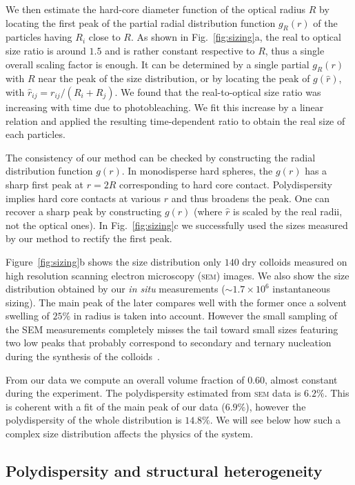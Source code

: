 \documentclass[8.5pt,twoside,twocolumn]{article}
\begin{document}
We then estimate the hard-core diameter function of the optical radius $R$ by locating the first peak of the partial radial distribution function $g_R(r)$ of the particles having $R_i$ close to $R$. As shown in Fig.~\ref{fig:sizing}a, the real to optical size ratio is around $1.5$ and is rather constant respective to $R$, thus a single overall scaling factor is enough. It can be determined by a single partial $g_R(r)$ with $R$ near the peak of the size distribution, or by locating the peak of $g(\hat{r})$, with $\hat{r}_{ij} = r_{ij}/(R_i+R_j)$. We found that the real-to-optical size ratio was increasing with time due to photobleaching. We fit this increase by a linear relation and applied the resulting time-dependent ratio to obtain the real size of each particles.

The consistency of our method can be checked by constructing the radial distribution function $g(r)$. In monodisperse hard spheres, the $g(r)$ has a sharp first peak at $r=2R$ corresponding to hard core contact. Polydispersity implies hard core contacts at various $r$ and thus broadens the peak. One can recover a sharp peak by constructing $g(\hat{r})$ (where $\hat{r}$ is scaled by the real radii, not the optical ones). In Fig.~\ref{fig:sizing}c we successfully used the sizes measured by our method to rectify the first peak.

Figure~\ref{fig:sizing}b shows the size distribution only $140$ dry colloids measured on high resolution scanning electron microscopy (\textsc{sem}) images. We also show the size distribution obtained by our \emph{in situ} measurements ($\sim 1.7\times 10^6$ instantaneous sizing). The main peak of the later compares well with the former once a solvent swelling of $25\%$ in radius is taken into account. However the small sampling of the SEM measurements completely misses the tail toward small sizes featuring two low peaks that probably correspond to secondary and ternary nucleation during the synthesis of the colloids~\cite{bosma2002,Poon2012}.

From our data we compute an overall volume fraction of $0.60$, almost constant during the experiment. The polydispersity estimated from \textsc{sem} data is $6.2\%$. This is coherent with a fit of the main peak of our data ($6.9\%$), however the polydispersity of the whole distribution is $14.8\%$. We will see below how such a complex size distribution affects the physics of the system.



\subsection{Polydispersity and structural heterogeneity}
\end{document}

